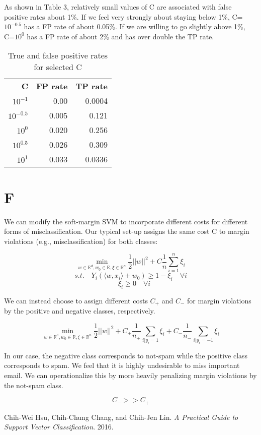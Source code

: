 \documentclass{article}
\begin{document}
As shown in Table 3, relatively small values of C are associated with false
positive rates about 1\%. If we feel very strongly about staying below 1\%,
C=$10^{-0.5}$ has a FP rate of about 0.05\%. If we are willing to go slightly
above 1\%, C=$10^{0}$ has a FP rate of about 2\% and has over double the TP
rate.

\begin{table}[h!]
	\caption{True and false positive rates for selected C}
	\centering
	\begin{tabular}{|r r r|}
		\hline
		\textbf{C} & \textbf{FP rate} & \textbf{TP rate} \\
		$10^{-1}$ & 0.00 & 0.0004 \\
		$10^{-0.5}$ & 0.005 & 0.121 \\
		$10^{0}$ & 0.020 & 0.256 \\
		$10^{0.5}$ & 0.026 & 0.309 \\
		$10^{1}$ & 0.033 & 0.0336 \\
		\hline
	\end{tabular}
\end{table}

\section*{F}

We can modify the soft-margin SVM to incorporate different costs for different
forms of misclassification. Our typical set-up assigns the same cost C to margin
violations (e.g., misclassification) for both classes:

$$
\min_{w \in \mathbb{R}^d, w_0 \in \mathbb{R}, \xi \in \mathbb{R}^n} 
\frac{1}{2} ||w||^2 + C \frac{1}{n} \sum_{i=1}^n \xi_i
$$
$$
s.t. \quad Y_i(\langle w, x_i \rangle + w_0) \geq 1 - \xi_i \quad \forall i
$$
$$
\quad \xi_i \geq 0 \quad \forall i
$$

We can instead choose to assign different costs $C_+$ and $C_-$ for margin
violations by the positive and negative classes, respectively. 

$$
\min_{w \in \mathbb{R^d}, w_0 \in \mathbb{R}, \xi \in \mathbb{R}^n} 
\frac{1}{2} ||w||^2 + C_+ \frac{1}{n_+} \sum_{i | y_i = 1} \xi_i + 
C_- \frac{1}{n_-} \sum_{i | y_i = -1} \xi_i
$$

In our case, the negative class corresponds to not-spam while the positive class
corresponds to spam. We feel that it is highly undesirable to miss important
email. We can operationalize this by more heavily penalizing margin violations
by the not-spam class.

$$
C_- >> C_+
$$

\begin{thebibliography}{2}
		Chih-Wei Hsu, Chih-Chung Chang, and Chih-Jen Lin.
		\textit{A Practical Guide to Support Vector Classification}.
		2016.

\end{thebibliography}
\end{document}
